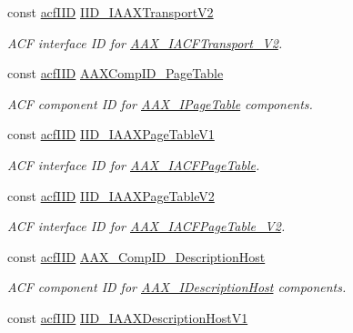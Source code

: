 \begin{Indent}
\begin{DoxyCompactItemize}
const \mbox{\hyperlink{a00269_a59df0b41744eee7a066787aaedf97f67}{acf\+I\+ID}} \mbox{\hyperlink{a00683_a766ade9b30cfff0223a033630ddfda3c}{I\+I\+D\+\_\+\+I\+A\+A\+X\+Transport\+V2}}
\begin{DoxyCompactList}\small\item\em A\+CF interface ID for \mbox{\hyperlink{a01761}{A\+A\+X\+\_\+\+I\+A\+C\+F\+Transport\+\_\+\+V2}}. \end{DoxyCompactList}\item 
const \mbox{\hyperlink{a00269_a59df0b41744eee7a066787aaedf97f67}{acf\+I\+ID}} \mbox{\hyperlink{a00683_ab7a7eb58fd2e7fb243dd7deaf9416faa}{A\+A\+X\+Comp\+I\+D\+\_\+\+Page\+Table}}
\begin{DoxyCompactList}\small\item\em A\+CF component ID for \mbox{\hyperlink{a01849}{A\+A\+X\+\_\+\+I\+Page\+Table}} components. \end{DoxyCompactList}\item 
const \mbox{\hyperlink{a00269_a59df0b41744eee7a066787aaedf97f67}{acf\+I\+ID}} \mbox{\hyperlink{a00683_a04d4f5570116d51b5ac4b0d4f660e7ea}{I\+I\+D\+\_\+\+I\+A\+A\+X\+Page\+Table\+V1}}
\begin{DoxyCompactList}\small\item\em A\+CF interface ID for \mbox{\hyperlink{a01725}{A\+A\+X\+\_\+\+I\+A\+C\+F\+Page\+Table}}. \end{DoxyCompactList}\item 
const \mbox{\hyperlink{a00269_a59df0b41744eee7a066787aaedf97f67}{acf\+I\+ID}} \mbox{\hyperlink{a00683_a028bd21ca7e74fcb2dc4587219be8721}{I\+I\+D\+\_\+\+I\+A\+A\+X\+Page\+Table\+V2}}
\begin{DoxyCompactList}\small\item\em A\+CF interface ID for \mbox{\hyperlink{a01729}{A\+A\+X\+\_\+\+I\+A\+C\+F\+Page\+Table\+\_\+\+V2}}. \end{DoxyCompactList}\item 
const \mbox{\hyperlink{a00269_a59df0b41744eee7a066787aaedf97f67}{acf\+I\+ID}} \mbox{\hyperlink{a00683_a9a13fa824d749a47cab7e7d9f7482600}{A\+A\+X\+\_\+\+Comp\+I\+D\+\_\+\+Description\+Host}}
\begin{DoxyCompactList}\small\item\em A\+CF component ID for \mbox{\hyperlink{a01793}{A\+A\+X\+\_\+\+I\+Description\+Host}} components. \end{DoxyCompactList}\item 
const \mbox{\hyperlink{a00269_a59df0b41744eee7a066787aaedf97f67}{acf\+I\+ID}} \mbox{\hyperlink{a00683_a1ffea676bbcfc48ac90e39ea2c2a735b}{I\+I\+D\+\_\+\+I\+A\+A\+X\+Description\+Host\+V1}}

\end{DoxyCompactItemize}
\end{Indent}
